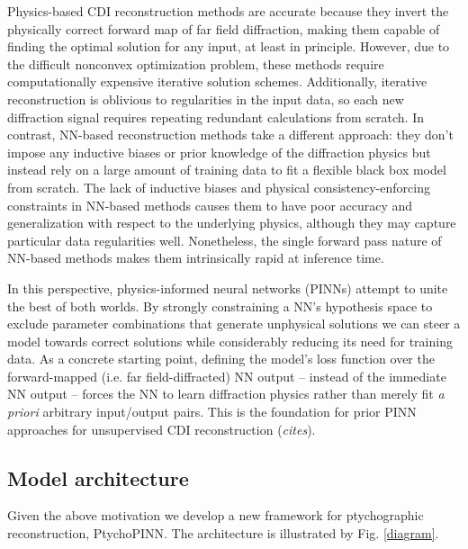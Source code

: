 \documentclass[sn-mathphys]{sn-jnl}%
\theoremstyle{thmstyleone}%
\theoremstyle{thmstyletwo}%
\theoremstyle{thmstylethree}%
\begin{document}
Physics-based CDI reconstruction methods are accurate because they invert the physically correct forward map of far field diffraction, making them capable of finding the optimal solution for any input, at least in principle. However, due to the difficult nonconvex optimization problem, these methods require computationally expensive iterative solution schemes. Additionally, iterative reconstruction is oblivious to regularities in the input data, so each new diffraction signal requires repeating redundant calculations from scratch. In contrast, NN-based reconstruction methods take a different approach: they don't impose any inductive biases or prior knowledge of the diffraction physics but instead rely on a large amount of training data to fit a flexible black box model from scratch. The lack of inductive biases and physical consistency-enforcing constraints in NN-based methods causes them to have poor accuracy and generalization with respect to the underlying physics, although they may capture particular data regularities well. Nonetheless, the single forward pass nature of NN-based methods makes them intrinsically rapid at inference time.

In this perspective, physics-informed neural networks (PINNs) attempt to unite the best of both worlds. By strongly constraining a NN's hypothesis space to exclude parameter combinations that generate unphysical solutions we can steer a model towards correct solutions while considerably reducing its need for training data. As a concrete starting point, defining the model's loss function over the forward-mapped (i.e. far field-diffracted) NN output -- instead of the immediate NN output -- forces the NN to learn diffraction physics rather than merely fit \emph{a priori} arbitrary input/output pairs. This is the foundation for prior PINN approaches for unsupervised CDI reconstruction (\emph{cites}).

\subsection{Model architecture}
Given the above motivation we develop a new framework for ptychographic reconstruction, PtychoPINN. The architecture is illustrated by Fig. \ref{diagram}.
\end{document}
